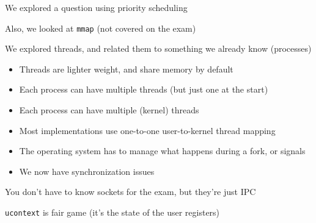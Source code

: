   \begin{slide}


    We explored a question using priority scheduling
    \medskip

    Also, we looked at \texttt{mmap} (not covered on the exam)

  \end{slide}

  \begin{slide}


    We explored threads, and related them to something we already know (processes)

    \begin{itemize}
      \item Threads are lighter weight, and share memory by default
      \item Each process can have multiple threads (but just one at the start)
    \end{itemize}

  \end{slide}

  \begin{slide}


    \begin{itemize}
      \item Each process can have multiple (kernel) threads
      \item Most implementations use one-to-one user-to-kernel thread mapping
      \item The operating system has to manage what happens during a fork, or signals
      \item We now have synchronization issues
    \end{itemize}

  \end{slide}

  \begin{slide}


    You don't have to know sockets for the exam, but they're just IPC
    \medskip

    \texttt{ucontext} is fair game (it's the state of the user registers)

  \end{slide}

